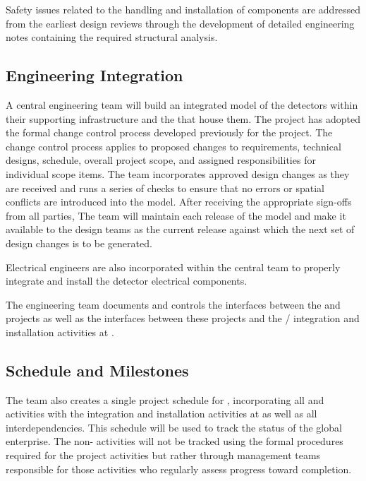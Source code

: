 Safety issues related to the handling 
and installation of components are addressed  
from the earliest design reviews through the development 
of detailed engineering notes containing the required
structural analysis.


\subsection{Engineering Integration}
\label{sec:dune_engineering}


A central  engineering team will build 
an integrated model of the detectors within their supporting
infrastructure and the  that house them.  
The  project has adopted 
the formal change control process developed previously for the 
 project.  The change control process applies to 
proposed changes to requirements, technical designs, 
schedule, overall project scope, and assigned responsibilities 
for individual scope items. 
The  team incorporates approved design changes as they 
are received and runs a series of checks to ensure that no errors 
or spatial conflicts are introduced into the model. After receiving the 
appropriate sign-offs from all parties, 
The  team will maintain  
each release  of the model and make it available to the 
design teams as the current release against which the next set 
of design changes is to be generated. 

Electrical engineers are also incorporated within the central
 team to properly integrate and install 
the detector electrical components.  

The  engineering team documents and
controls the interfaces between the  and  
projects as well as the interfaces between these projects and the 
/ integration and installation activities 
at .  


\subsection{Schedule and Milestones}
\label{sec:dune_schedule}

The  team also creates a single 
project schedule for , incorporating all 
 and  activities with the 
integration and installation activities at  
as well as all interdependencies.  This schedule will 
be used to track the status of the global enterprise.  
  The non- activities 
will not be tracked using the formal  procedures 
required for the  project activities but rather 
through management teams responsible for those activities who regularly assess progress toward completion.  


